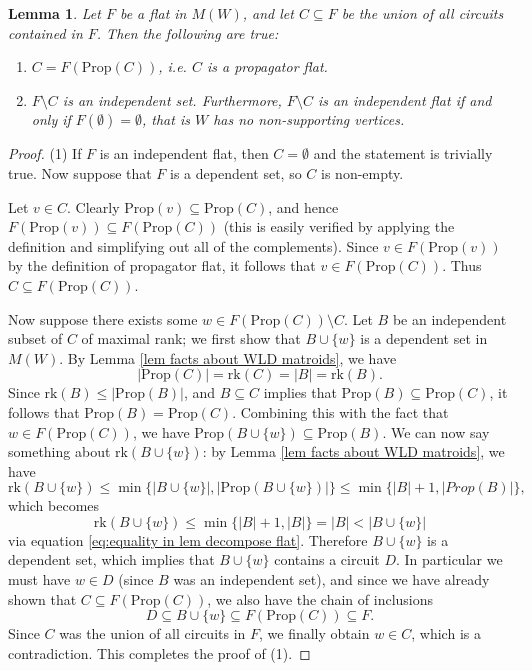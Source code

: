 \documentclass[11pt]{article}
\newcommand{\rk}{\textrm{rk} }
\newcommand{\Prop}{\textrm{Prop}}
\newtheorem{lem}[thm]{Lemma}
\theoremstyle{remark}
\theoremstyle{definition}
\begin{document}

\begin{lem} \label{lem decompose flat}Let $F$ be a flat in $M(W)$, and let $C \subseteq F$ be the union of all circuits contained in $F$. Then the following are true:
\begin{enumerate}
\item $C = F(\Prop (C))$, i.e. $C$ is a propagator flat.
\item $F \setminus C$ is an independent set. Furthermore, $F\setminus C$ is an independent flat if and only if $F(\emptyset) = \emptyset$, that is $W$ has no non-supporting vertices.  
\end{enumerate}
\end{lem}

\begin{proof}
(1) If $F$ is an independent flat, then $C = \emptyset$ and the statement is trivially true. Now suppose that $F$ is a dependent set, so $C$ is non-empty.

Let $v \in C$. Clearly $\Prop(v) \subseteq \Prop(C)$, and hence $F(\Prop(v)) \subseteq F(\Prop(C))$ (this is easily verified by applying the definition and simplifying out all of the complements). Since $v \in F(\Prop(v))$ by the definition of propagator flat, it follows that $v \in F(\Prop(C))$. Thus $C \subseteq F(\Prop(C))$.

Now suppose there exists some $w \in  F(\Prop(C)) \setminus C$. Let $B$ be an independent subset of $C$ of maximal rank; we first show that $B \cup \{w\}$ is a dependent set in $M(W)$. By Lemma \ref{lem facts about WLD matroids}, we have
\begin{equation}\label{eq:equality in lem decompose flat} |\Prop(C)| = \rk(C) = |B| = \rk(B) .\end{equation}
Since $\rk(B) \leq |\Prop(B)|$, and $B \subseteq C$ implies that  $\Prop(B) \subseteq \Prop(C)$, it follows that $\Prop(B) = \Prop(C)$. Combining this with the fact that $w \in F(\Prop(C))$, we have $\Prop(B\cup \{w\}) \subseteq \Prop(B)$. We can now say something about $\rk(B\cup \{w\})$: by Lemma \ref{lem facts about WLD matroids}, we have 
\[
\rk (B \cup \{w\}) \leq \min\{|B\cup \{w\}|, |\Prop(B\cup \{w\})|\} \leq \min\{|B|+1,|Prop(B)|\},
\]
which becomes 
\[\rk(B\cup \{w\}) \leq \min\{|B|+1,|B|\} = |B| < |B \cup\{w\}|\]
via equation \eqref{eq:equality in lem decompose flat}. Therefore $B\cup\{w\}$ is a dependent set, which implies that $B\cup \{w\}$ contains a circuit $D$. In particular we must have $w \in D$ (since $B$ was an independent set), and since we have already shown that $C \subseteq F(\Prop(C))$, we also have the chain of inclusions 
\[D \subseteq B\cup \{w\} \subseteq F(\Prop(C)) \subseteq F.\]
Since $C$ was the union of all circuits in $F$, we finally obtain $w \in C$, which is a contradiction. This completes the proof of (1).



\end{proof}
\end{document}

